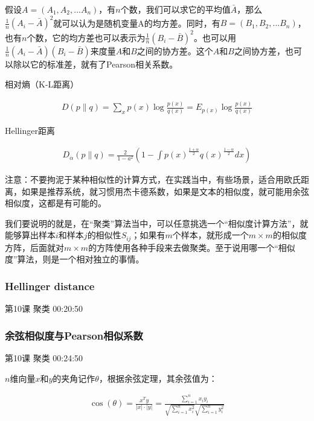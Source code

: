 \documentclass[UTF8]{ctexart}
\begin{document}
假设$A=(A_{1},A_{2},...A_{n})$，有$n$个数，我们可以求它的平均值$\bar{A}$，那么$\frac{1}{n}(A_{i}-\bar{A})^{2}$就可以认为是随机变量A的均方差。同时，有$B=(B_{1},B_{2},...B_{n})$，也有$n$个数，它的均方差也可以表示为$\frac{1} {n}(B_{i}-\bar{B})^{2}$。也可以用$\frac{1} {n}(A_{i}-\bar{A})(B_{i}-\bar{B})$来度量$A$和$B$之间的协方差。这个$A$和$B$之间协方差，也可以除以它的标准差，就有了Pearson相关系数。

相对熵（K-L距离）

\begin{equation}
\begin{aligned}
D(p \parallel q) = \sum_{x}^{ }p(x) \log \frac{p(x)}{q(x)}=E_{p(x)}\log \frac{p(x)}{q(x)}
\end{aligned}
\end{equation}

Hellinger距离

\begin{equation}
\begin{aligned}
D_{\alpha}(p \parallel q) = \frac{2}{1-a^{2}} \left ( 1- \int p(x)^{\frac{1+\alpha}{2}} q(x)^{\frac{1-\alpha}{2}} dx\right )
\end{aligned}
\end{equation}

注意：不要拘泥于某种相似性的计算方式，在实践当中，有些场景，适合用欧氏距离，如果是推荐系统，就习惯用杰卡德系数，如果是文本的相似度，就可能用余弦相似度，这都是有可能的。

我们要说明的就是，在“聚类”算法当中，可以任意挑选一个“相似度计算方法”，就能够算出样本$i$和样本$j$的相似性$S_{ij}$；如果有$m$个样本，就形成一个$m \times m$的相似度方阵，后面就对$m \times m$的方阵使用各种手段来去做聚类。至于说用哪一个“相似度”算法，则是一个相对独立的事情。

\subsubsection{Hellinger distance}

第10课 聚类 00:20:50

\subsubsection{余弦相似度与Pearson相似系数}

第10课 聚类 00:24:50

$n$维向量$x$和$y$的夹角记作$\theta$，根据余弦定理，其余弦值为：

\begin{equation}
\begin{aligned}
\cos (\theta) = \frac{x^{T}y}{|x| \cdot |y|}=\frac{\sum_{i=1}^{n}x_{i}y_{i}}{\sqrt{\sum_{i=1}^{n}x^{2}_{i}}\sqrt{\sum_{i=1}^{n}y^{2}_{i}}}
\end{aligned}
\end{equation}
\end{document}
